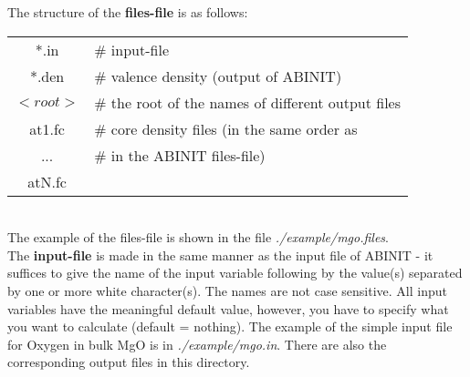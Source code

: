 \documentclass[11pt]{article}
\begin{document}
The structure of the {\bf files-file} is as follows: \\[1.5\baselineskip]
\begin{tabular}{cl}
 *.in   & \# input-file \\
 *.den  & \# valence density (output of ABINIT) \\
 $<root>$ & \# the root of the names of different output files \\
 at1.fc & \# core density files (in the same order as \\
 ...    & \# in the ABINIT files-file) \\
 atN.fc & \\
\end{tabular} \\[1.5\baselineskip]
The example of the files-file is shown in the file {\it ./example/mgo.files}.\\

The {\bf input-file} is made in the same manner as the input file of
ABINIT - it suffices to give the name of the input variable following
by the value(s) separated by one or more white character(s).
The names are not case sensitive. All input variables have the meaningful
default value, however, you have to specify what you want to calculate
(default = nothing). The example of the simple input file for Oxygen in
bulk MgO is in {\it ./example/mgo.in}. There are also the
corresponding output files in this directory.\\
\end{document}
